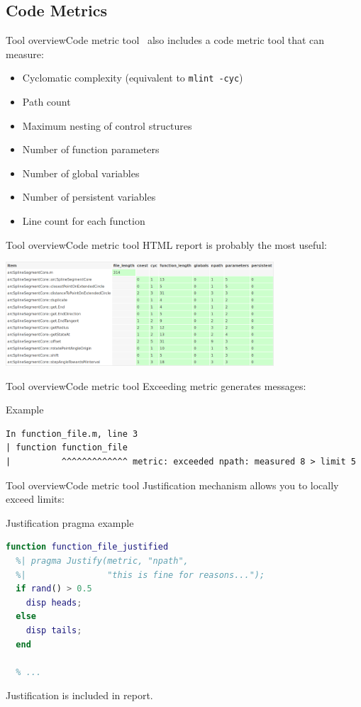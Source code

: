 \documentclass{beamer}
\newcommand{\mh}[0]{{\sc\structure{Miss\_Hit}}}
\begin{document}
\subsection{Code Metrics}
\begin{frame}{Tool overview}{Code metric tool}
  \mh~also includes a code metric tool that can measure:
  \begin{itemize}
  \item Cyclomatic complexity (equivalent to {\tt mlint -cyc})
  \item Path count
  \item Maximum nesting of control structures
  \item Number of function parameters
  \item Number of global variables
  \item Number of persistent variables
  \item Line count for each function
  \end{itemize}
\end{frame}

\begin{frame}{Tool overview}{Code metric tool}
  HTML report is probably the most useful:
  \begin{center}
    \includegraphics[width=10cm]{metrics.png}
  \end{center}
\end{frame}

\begin{frame}[fragile]{Tool overview}{Code metric tool}
  Exceeding metric generates messages:
  \begin{block}{Example}
    \scriptsize
\begin{verbatim}
In function_file.m, line 3
| function function_file
|          ^^^^^^^^^^^^^ metric: exceeded npath: measured 8 > limit 5
\end{verbatim}
  \end{block}
\end{frame}

\begin{frame}[fragile]{Tool overview}{Code metric tool}
  Justification mechanism allows you to locally exceed limits:
  \begin{block}{Justification pragma example}
\begin{lstlisting}[language=MATLAB]
function function_file_justified
  %| pragma Justify(metric, "npath",
  %|                "this is fine for reasons...");
  if rand() > 0.5
    disp heads;
  else
    disp tails;
  end

  % ...
\end{lstlisting}
  \end{block}
  \pause
  Justification is included in report.
\end{frame}
\end{document}
